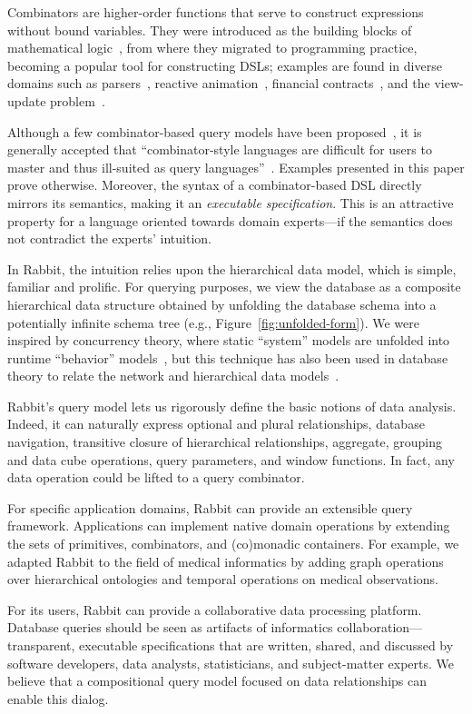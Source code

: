 Combinators are higher-order functions that serve to construct expressions
without bound variables.  They were introduced as the building blocks of
mathematical logic~\cite{Schoenfinkel1924, Curry1930}, from where they migrated
to programming practice, becoming a popular tool for constructing DSLs;
examples are found in diverse domains such as parsers~\cite{Wadler1985,
Hutton1996}, reactive animation~\cite{Elliott1997}, financial
contracts~\cite{Jones2000}, and the view-update problem~\cite{Foster2005}.

Although a few combinator-based query models have been
proposed~\cite{Buneman1979, Bossi1984, Batory1988, Erwig1991, Cherniack1996},
it is generally accepted that ``combinator-style languages are difficult for
users to master and thus ill-suited as query languages''~\cite{Cherniack1996}.
Examples presented in this paper prove otherwise.  Moreover, the syntax of a
combinator-based DSL directly mirrors its semantics, making it an
\emph{executable specification}.  This is an attractive property for a language
oriented towards domain experts---if the semantics does not contradict the
experts' intuition.

In Rabbit, the intuition relies upon the hierarchical data model, which is
simple, familiar and prolific.  For querying purposes, we view the database as
a composite hierarchical data structure obtained by unfolding the database
schema into a potentially infinite schema tree (e.g.,
Figure~\ref{fig:unfolded-form}).  We were inspired by concurrency theory, where
static ``system'' models are unfolded into runtime ``behavior''
models~\cite{Nielsen1994}, but this technique has also been used in database
theory to relate the network and hierarchical data models~\cite{Cartmell1985}.

Rabbit's query model lets us rigorously define the basic notions of data
analysis.  Indeed, it can naturally express optional and plural relationships,
database navigation, transitive closure of hierarchical relationships,
aggregate, grouping and data cube operations, query parameters, and window
functions.  In fact, any data operation could be lifted to a query combinator.

For specific application domains, Rabbit can provide an extensible query
framework.  Applications can implement native domain operations by extending
the sets of primitives, combinators, and (co)monadic containers.  For example,
we adapted Rabbit to the field of medical informatics by adding graph
operations over hierarchical ontologies and temporal operations on medical
observations.

For its users, Rabbit can provide a collaborative data processing platform.
Database queries should be seen as artifacts of informatics
collaboration---transparent, executable specifications that are written,
shared, and discussed by software developers, data analysts, statisticians, and
subject-matter experts.  We believe that a compositional query model focused on
data relationships can enable this dialog.

